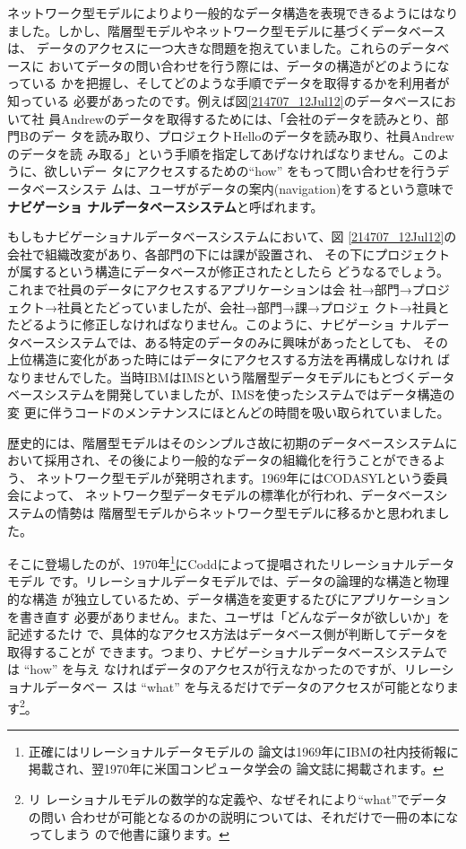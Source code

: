 ネットワーク型モデルによりより一般的なデータ構造を表現できるようにはなり
ました。しかし、階層型モデルやネットワーク型モデルに基づくデータベースは、
データのアクセスに一つ大きな問題を抱えていました。これらのデータベースに
おいてデータの問い合わせを行う際には、データの構造がどのようになっている
かを把握し、そしてどのような手順でデータを取得するかを利用者が知っている
必要があったのです。例えば図\ref{214707_12Jul12}のデータベースにおいて社
員Andrewのデータを取得するためには、「会社のデータを読みとり、部門Bのデー
タを読み取り、プロジェクトHelloのデータを読み取り、社員Andrewのデータを読
み取る」という手順を指定してあげなければなりません。このように、欲しいデー
タにアクセスするための``how'' をもって問い合わせを行うデータベースシステ
ムは、ユーザがデータの案内(navigation)をするという意味で{\bf ナビゲーショ
ナルデータベースシステム}と呼ばれます。

もしもナビゲーショナルデータベースシステムにおいて、図
\ref{214707_12Jul12}の会社で組織改変があり、各部門の下には課が設置され、
その下にプロジェクトが属するという構造にデータベースが修正されたとしたら
どうなるでしょう。これまで社員のデータにアクセスするアプリケーションは会
社→部門→プロジェクト→社員とたどっていましたが、会社→部門→課→プロジェ
クト→社員とたどるように修正しなければなりません。このように、ナビゲーショ
ナルデータベースシステムでは、ある特定のデータのみに興味があったとしても、
その上位構造に変化があった時にはデータにアクセスする方法を再構成しなけれ
ばなりませんでした。当時IBMはIMSという階層型データモデルにもとづくデータ
ベースシステムを開発していましたが、IMSを使ったシステムではデータ構造の変
更に伴うコードのメンテナンスにほとんどの時間を吸い取られていました。

歴史的には、階層型モデルはそのシンプルさ故に初期のデータベースシステムに
おいて採用され、その後により一般的なデータの組織化を行うことができるよう、
ネットワーク型モデルが発明されます。1969年にはCODASYLという委員会によって、
ネットワーク型データモデルの標準化が行われ、データベースシステムの情勢は
階層型モデルからネットワーク型モデルに移るかと思われました。

そこに登場したのが、1970年\footnote{正確にはリレーショナルデータモデルの
論文は1969年にIBMの社内技術報に掲載され、翌1970年に米国コンピュータ学会の
論文誌に掲載されます。}にCoddによって提唱されたリレーショナルデータモデル
です。リレーショナルデータモデルでは、データの論理的な構造と物理的な構造
が独立しているため、データ構造を変更するたびにアプリケーションを書き直す
必要がありません。また、ユーザは「どんなデータが欲しいか」を記述するたけ
で、具体的なアクセス方法はデータベース側が判断してデータを取得することが
できます。つまり、ナビゲーショナルデータベースシステムでは ``how'' を与え
なければデータのアクセスが行えなかったのですが、リレーショナルデータベー
スは ``what'' を与えるだけでデータのアクセスが可能となります\footnote{リ
レーショナルモデルの数学的な定義や、なぜそれにより``what''でデータの問い
合わせが可能となるのかの説明については、それだけで一冊の本になってしまう
ので他書に譲ります。}。

